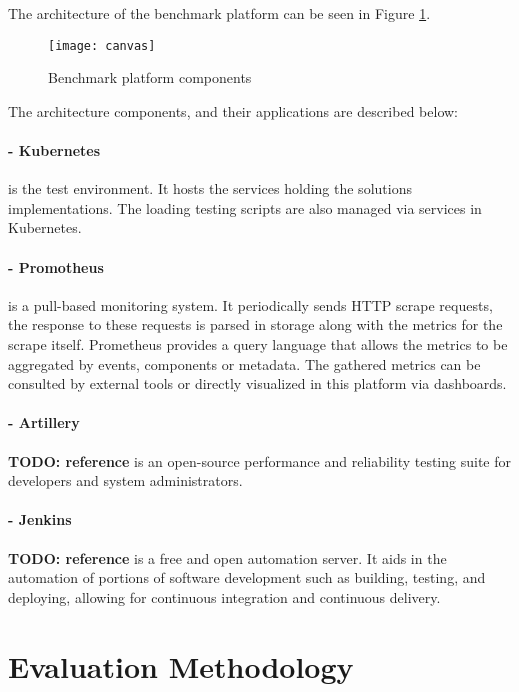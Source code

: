 The architecture of the benchmark platform can be seen in Figure \ref{fig:canvas}.

\begin{figure}[htbp]
    \centering
    \texttt{[image: canvas]}
    \caption{Benchmark platform components}
    \label{fig:canvas}
\end{figure}

\newpage

The architecture components, and their applications are described below:

\paragraph{- Kubernetes \cite{kubernetes}} is the test environment.
It hosts the services holding the solutions implementations.
The loading testing scripts are also managed via services in Kubernetes.

\paragraph{- Promotheus \cite{turnbull2018monitoring}} is a pull-based monitoring system.
It periodically sends HTTP scrape requests, the response to these requests is parsed in storage along with the metrics for the scrape itself.
Prometheus provides a query language that allows the metrics to be aggregated by events, components or metadata.
The gathered metrics can be consulted by external tools or directly visualized in this platform via dashboards.

\paragraph{- Artillery} \textbf{TODO: reference}
is an open-source performance and reliability testing suite for developers and system administrators.

\paragraph{- Jenkins} \textbf{TODO: reference}
is a free and open automation server.
It aids in the automation of portions of software development such as building, testing, and deploying, allowing for continuous integration and continuous delivery.

\section{Evaluation Methodology} %
\label{sec:evaluation_methodology}

